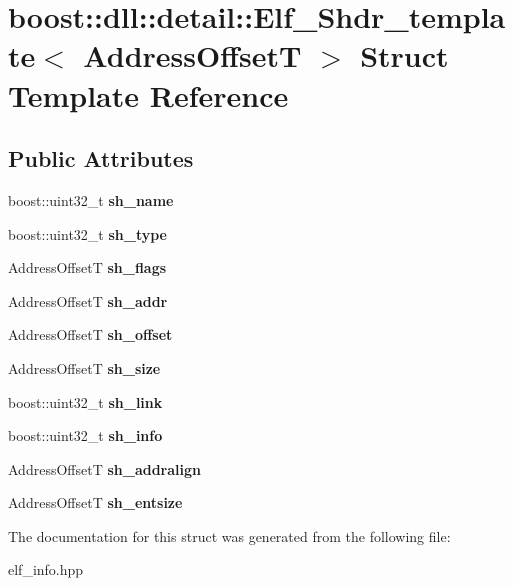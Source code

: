\hypertarget{a01392}{}\section{boost\+:\+:dll\+:\+:detail\+:\+:Elf\+\_\+\+Shdr\+\_\+template$<$ Address\+OffsetT $>$ Struct Template Reference}
\label{a01392}
\subsection*{Public Attributes}
\begin{DoxyCompactItemize}
\item 
\mbox{\label{a01392_af74b85fd375874942acab42fb236938b}} 
boost\+::uint32\+\_\+t {\bfseries sh\+\_\+name}
\item 
\mbox{\label{a01392_aef81ee9415e932f037457039ecb6062a}} 
boost\+::uint32\+\_\+t {\bfseries sh\+\_\+type}
\item 
\mbox{\label{a01392_a0cf665258d1353d703dbe5f03b06377c}} 
Address\+OffsetT {\bfseries sh\+\_\+flags}
\item 
\mbox{\label{a01392_a96484407d371204d2cdf512c946a3035}} 
Address\+OffsetT {\bfseries sh\+\_\+addr}
\item 
\mbox{\label{a01392_a218d431d671c785239cbe32d5f566329}} 
Address\+OffsetT {\bfseries sh\+\_\+offset}
\item 
\mbox{\label{a01392_a0e8fbbadfb65a2c456951a632a114b0f}} 
Address\+OffsetT {\bfseries sh\+\_\+size}
\item 
\mbox{\label{a01392_a0f3c4d6a3f6db4ce3debe84bfab65aa4}} 
boost\+::uint32\+\_\+t {\bfseries sh\+\_\+link}
\item 
\mbox{\label{a01392_ab2ae82258ef53873e52f5711efd46f69}} 
boost\+::uint32\+\_\+t {\bfseries sh\+\_\+info}
\item 
\mbox{\label{a01392_a8b78c53bdbdd717f69a20f53427d99d5}} 
Address\+OffsetT {\bfseries sh\+\_\+addralign}
\item 
\mbox{\label{a01392_a736b1d41e2034475f8dcf3119614e88d}} 
Address\+OffsetT {\bfseries sh\+\_\+entsize}
\end{DoxyCompactItemize}


The documentation for this struct was generated from the following file\+:\begin{DoxyCompactItemize}
\item 
elf\+\_\+info.\+hpp\end{DoxyCompactItemize}
